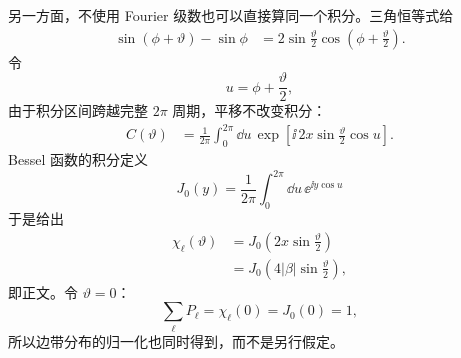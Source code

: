 \begin{derivation}
另一方面，不使用 Fourier 级数也可以直接算同一个积分。三角恒等式给
\begin{align*}
 \sin(\phi+\vartheta)-\sin\phi
 &=2\sin\frac{\vartheta}{2}
 \cos\!\left(\phi+\frac{\vartheta}{2}\right).
\end{align*}
令
\begin{equation*}
 u=\phi+\frac{\vartheta}{2},
\end{equation*}
由于积分区间跨越完整 $2\pi$ 周期，平移不改变积分：
\begin{align*}
 C(\vartheta)
 &=\frac1{2\pi}\int_0^{2\pi}\dd u\,
 \exp\!\left[
 \ii\,2x\sin\frac{\vartheta}{2}\cos u
 \right].
\end{align*}
Bessel 函数的积分定义
\begin{equation*}
 J_0(y)
 =\frac1{2\pi}\int_0^{2\pi}\dd u\,\ee^{\ii y\cos u}
\end{equation*}
于是给出
\begin{align*}
 \chi_\ell(\vartheta)
 &=J_0\!\left(2x\sin\frac{\vartheta}{2}\right)\\
 &=J_0\!\left(4|\beta|\sin\frac{\vartheta}{2}\right),
\end{align*}
即正文。令 $\vartheta=0$：
\begin{equation*}
 \sum_\ell P_\ell
 =\chi_\ell(0)=J_0(0)=1,
\end{equation*}
所以边带分布的归一化也同时得到，而不是另行假定。


\end{derivation}
